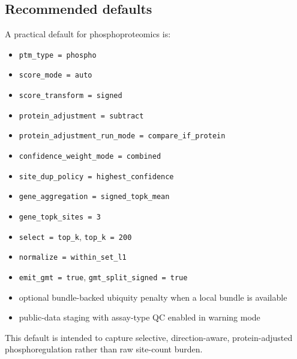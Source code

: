 \documentclass[11pt]{article}
\begin{document}
\subsection{Recommended defaults}
A practical default for phosphoproteomics is:
\begin{itemize}
\item \texttt{ptm\_type = phospho}
\item \texttt{score\_mode = auto}
\item \texttt{score\_transform = signed}
\item \texttt{protein\_adjustment = subtract}
\item \texttt{protein\_adjustment\_run\_mode = compare\_if\_protein}
\item \texttt{confidence\_weight\_mode = combined}
\item \texttt{site\_dup\_policy = highest\_confidence}
\item \texttt{gene\_aggregation = signed\_topk\_mean}
\item \texttt{gene\_topk\_sites = 3}
\item \texttt{select = top\_k}, \texttt{top\_k = 200}
\item \texttt{normalize = within\_set\_l1}
\item \texttt{emit\_gmt = true}, \texttt{gmt\_split\_signed = true}
\item optional bundle-backed ubiquity penalty when a local bundle is available
\item public-data staging with assay-type QC enabled in warning mode
\end{itemize}

This default is intended to capture selective, direction-aware,
protein-adjusted phosphoregulation rather than raw site-count burden.
\end{document}
